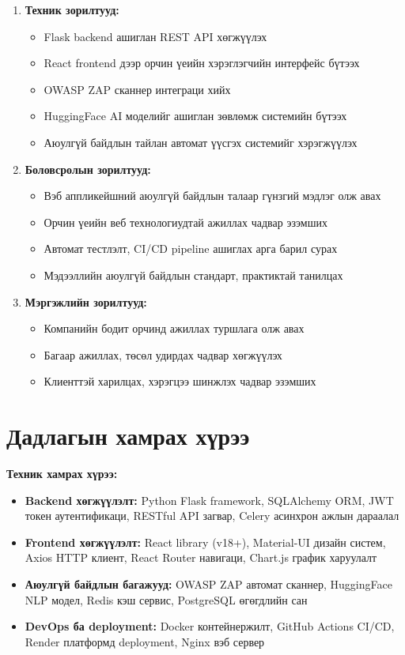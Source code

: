 \documentclass[main.tex]{subfiles}
\begin{document}
\begin{enumerate}
    \item \textbf{Техник зорилтууд:}
    \begin{itemize}
        \item Flask backend ашиглан REST API хөгжүүлэх
        \item React frontend дээр орчин үеийн хэрэглэгчийн интерфейс бүтээх
        \item OWASP ZAP сканнер интеграци хийх
        \item HuggingFace AI моделийг ашиглан зөвлөмж системийн бүтээх
        \item Аюулгүй байдлын тайлан автомат үүсгэх системийг хэрэгжүүлэх
    \end{itemize}
    
    \item \textbf{Боловсролын зорилтууд:}
    \begin{itemize}
        \item Вэб аппликейшний аюулгүй байдлын талаар гүнзгий мэдлэг олж авах
        \item Орчин үеийн веб технологиудтай ажиллах чадвар эзэмших
        \item Автомат тестлэлт, CI/CD pipeline ашиглах арга барил сурах
        \item Мэдээллийн аюулгүй байдлын стандарт, практиктай танилцах
    \end{itemize}
    
    \item \textbf{Мэргэжлийн зорилтууд:}
    \begin{itemize}
        \item Компанийн бодит орчинд ажиллах туршлага олж авах
        \item Багаар ажиллах, төсөл удирдах чадвар хөгжүүлэх
        \item Клиенттэй харилцах, хэрэгцээ шинжлэх чадвар эзэмших
    \end{itemize}
\end{enumerate}

\section*{Дадлагын хамрах хүрээ}

\textbf{Техник хамрах хүрээ:}

\begin{itemize}
    \item \textbf{Backend хөгжүүлэлт:} Python Flask framework, SQLAlchemy ORM, JWT токен аутентификаци, RESTful API загвар, Celery асинхрон ажлын дараалал
    \item \textbf{Frontend хөгжүүлэлт:} React library (v18+), Material-UI дизайн систем, Axios HTTP клиент, React Router навигаци, Chart.js график харуулалт
    \item \textbf{Аюулгүй байдлын багажууд:} OWASP ZAP автомат сканнер, HuggingFace NLP модел, Redis кэш сервис, PostgreSQL өгөгдлийн сан
    \item \textbf{DevOps ба deployment:} Docker контейнержилт, GitHub Actions CI/CD, Render платформд deployment, Nginx вэб сервер
\end{itemize}
\end{document}

